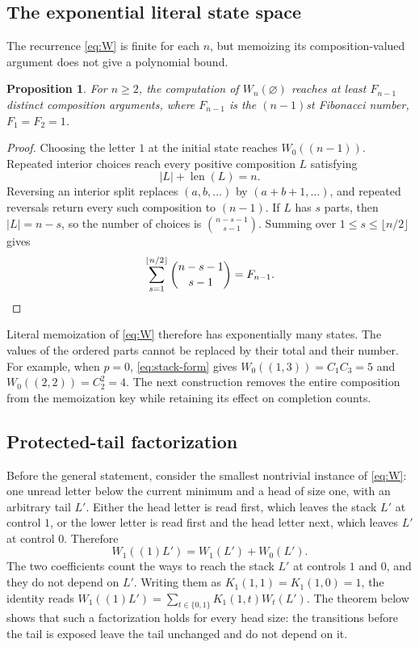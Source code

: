 \documentclass[11pt,reqno]{amsart}
\newtheorem{proposition}[proposition]{Proposition}
\theoremstyle{definition}
\theoremstyle{remark}
\begin{document}
\subsection{The exponential literal state space}

The recurrence \eqref{eq:W} is finite for each $n$, but memoizing its
composition-valued argument does not give a polynomial bound.

\begin{proposition}\label{prop:scalar-exponential}
For $n\geq2$, the computation of $W_n(\varnothing)$ reaches at least
$F_{n-1}$ distinct composition arguments, where $F_{n-1}$ is the $(n-1)$st
Fibonacci number, $F_1=F_2=1$.
\end{proposition}

\begin{proof}
Choosing the letter $1$ at the initial state reaches $W_0((n-1))$.  Repeated
interior choices reach every positive composition $L$ satisfying
\begin{equation}\label{eq:scalar-fib-comps}
 |L|+\operatorname{len}(L)=n.
\end{equation}
Reversing an interior split replaces
$(a,b,\ldots)$ by $(a+b+1,\ldots)$, and repeated reversals return every such
composition to $(n-1)$.  If $L$ has $s$ parts, then $|L|=n-s$, so the number
of choices is $\binom{n-s-1}{s-1}$.  Summing over
$1\leq s\leq\lfloor n/2\rfloor$ gives
\[
 \sum_{s=1}^{\lfloor n/2\rfloor}\binom{n-s-1}{s-1}=F_{n-1}.\qedhere
\]
\end{proof}

Literal memoization of \eqref{eq:W} therefore has exponentially many
states.  The values of the ordered parts cannot be replaced by their total
and their number.  For example, when $p=0$, \eqref{eq:stack-form} gives
$W_0((1,3))=C_1C_3=5$ and $W_0((2,2))=C_2^2=4$.  The next construction removes the entire
composition from the memoization key while retaining its effect on completion
counts.

\subsection{Protected-tail factorization}

Before the general statement, consider the smallest nontrivial instance of
\eqref{eq:W}: one unread letter below the current minimum and a head of size
one, with an arbitrary tail $L'$.  Either the head letter is read first, which leaves the stack $L'$ at
control $1$, or the lower letter is read first and the head letter next,
which leaves $L'$ at control $0$.  Therefore
\[
  W_1((1)L')=W_1(L')+W_0(L').
\]
The two coefficients count the ways to reach the stack $L'$ at
controls $1$ and $0$, and they do not depend on $L'$.  Writing them as
$K_1(1,1)=K_1(1,0)=1$, the identity reads
$W_1((1)L')=\sum_{t\in\{0,1\}}K_1(1,t)W_t(L')$.  The theorem below shows
that such a factorization holds for every head size: the transitions before
the tail is exposed leave the tail unchanged and do not depend on it.
\end{document}
